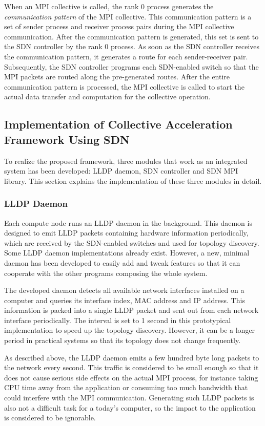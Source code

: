 When an MPI collective is called, the rank 0 process generates the
\emph{communication pattern} of the MPI collective. This communication pattern is
a set of sender process and receiver process pairs during the MPI collective
communication. After the communication pattern is generated, this set is sent
to the SDN controller by the rank 0 process. As soon as the SDN controller
receives the communication pattern, it generates a route for each
sender-receiver pair. Subsequently, the SDN controller programs each
SDN-enabled switch so that the MPI packets are routed along the pre-generated
routes. After the entire communication pattern is processed, the MPI
collective is called to start the actual data transfer and computation for the
collective operation.

\subsection{Implementation of Collective Acceleration Framework Using SDN}

To realize the proposed framework, three modules that work as an integrated
system has been developed: LLDP daemon, SDN controller and SDN MPI library.
This section explains the implementation of these three modules in detail.

\subsubsection{LLDP Daemon}

Each compute node runs an LLDP daemon in the background. This daemon is
designed to emit LLDP packets containing hardware information periodically,
which are received by the SDN-enabled switches and used for topology
discovery. Some LLDP daemon implementations already exist. However, a new,
minimal daemon has been developed to easily add and tweak features so that it
can cooperate with the other programs composing the whole system.

The developed daemon detects all available network interfaces installed on a
computer and queries its interface index, MAC address and IP address.
This information is packed into a single LLDP packet and sent out from
each network interface periodically. The interval is set to 1 second in
this prototypical implementation to speed up the topology discovery.
However, it can be a longer period in practical systems so that its
topology does not change frequently.

As described above, the LLDP daemon emits a few hundred byte long packets to
the network every second. This traffic is considered to be small enough so
that it does not cause serious side effects on the actual MPI process, for
instance taking CPU time away from the application or consuming too much
bandwidth that could interfere with the MPI communication. Generating such
LLDP packets is also not a difficult task for a today's  computer, so the
impact to the application is considered to be ignorable.

